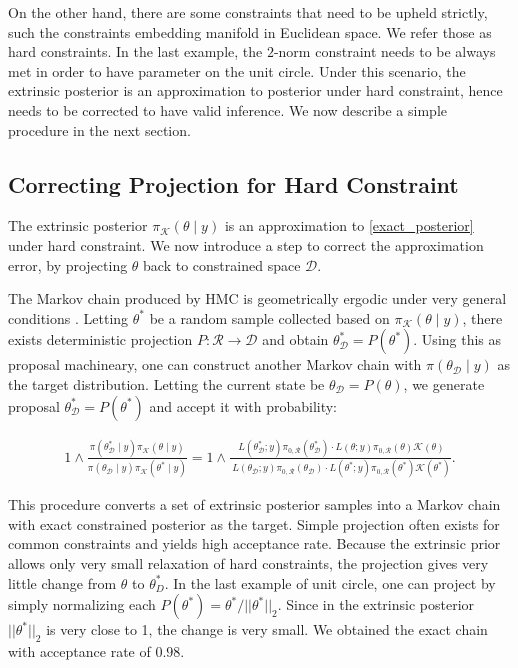 \documentclass[10pt]{article}
\newcommand{\mc}[1]{\mathcal{#1}}
\DeclareMathOperator{\1}{\mathbbm{1}}
\begin{document}
On the other hand, there are some constraints that need to be upheld strictly, such the constraints embedding manifold in Euclidean space. We refer those as hard constraints. In the last example, the $2$-norm constraint needs to be always met in order to have parameter on the unit circle. Under this scenario, the extrinsic posterior is an approximation to posterior under hard constraint, hence needs to be corrected to have valid inference. We now describe a simple procedure in the next section.

\subsection{Correcting Projection for Hard Constraint}
 
 The extrinsic posterior $\pi_{\mc K}(\theta \mid y)$ is an approximation to \eqref{exact_posterior} under hard constraint. We now introduce a step to correct the approximation error, by projecting $\theta$ back to constrained space $\mc D$.
 
The Markov chain produced by HMC is geometrically ergodic under very general conditions \citep{livingstone2016geometric}. Letting $\theta^*$ be a random sample collected based on $\pi_{\mc K}(\theta \mid y)$, there exists deterministic projection $P: \mc R\rightarrow \mc D$ and obtain $\theta^*_{\mc D}= P(\theta^*)$. Using this as proposal machineary, one can construct another Markov chain with $\pi(\theta_{\mc D}  \mid y)$ as the target distribution. Letting the current state be $\theta_{\mc D} = P(\theta)$, we generate proposal $\theta^*_{\mc D}= P(\theta^*)$ and accept it with probability:

\begin{equation}
 \begin{aligned}
 1 \wedge \frac{\pi(\theta^*_{\mc D} \mid y) \pi_{\mc K}(\theta  \mid y) }{\pi(\theta_{\mc D}  \mid y)\pi_{\mc K}(\theta^* \mid y)} =  1 \wedge \frac{\ L(\theta^*_{\mc D};y)\pi_{0,\mc R}(\theta^*_{\mc D})  \cdot    L(\theta;y)\pi_{0,\mc R}(\theta)   \mc K(\theta)}{\ L(\theta_{\mc D};y)\pi_{0,\mc R}(\theta_{\mc D})   \cdot L(\theta^*;y)\pi_{0,\mc R}(\theta^*)   \mc K(\theta^{*})}.
 \end{aligned}
 \end{equation}
 
 This procedure converts a set of extrinsic posterior samples into a Markov chain with exact constrained posterior as the target. Simple projection often exists for common constraints and yields high acceptance rate. Because the extrinsic prior allows only very small relaxation of hard constraints, the projection gives very little change from $\theta$ to $\theta^*_D$. In the last example of unit circle, one can project by simply normalizing each $P(\theta^*) = \theta^*/||\theta^{*}||_2$. Since in the extrinsic posterior $||\theta^{*}||_2$ is very close to 1, the change is very small. We obtained the exact chain with acceptance rate of $0.98$.
 
\end{document}

